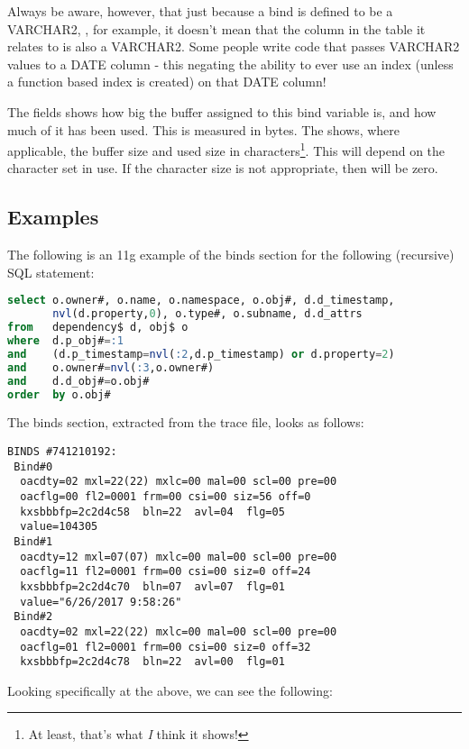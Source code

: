 Always be aware, however, that just because a bind is defined to be a VARCHAR2, , for example, it doesn't mean that the column in the table it relates to is also a VARCHAR2. Some people write code that passes VARCHAR2 values to a DATE column - this negating the ability to ever use an index (unless a function based index is created) on that DATE column!

The  fields shows how big the buffer assigned to this bind variable is, and how much of it has been used. This is measured in bytes. The  shows, where applicable, the buffer size and used size in characters\footnote{At least, that's what \emph{I} think it   shows!}. This will depend on the character set in use. If the character size is not appropriate, then  will be zero.

\subsection{Examples}\label{examples}

The following is an 11g example of the binds section for the following (recursive) SQL statement:

\begin{lstlisting}[language=SQL,caption={Example of Recursive SQL Statement}]
select o.owner#, o.name, o.namespace, o.obj#, d.d_timestamp, 
       nvl(d.property,0), o.type#, o.subname, d.d_attrs  
from   dependency$ d, obj$ o 
where  d.p_obj#=:1 
and    (d.p_timestamp=nvl(:2,d.p_timestamp) or d.property=2) 
and    o.owner#=nvl(:3,o.owner#) 
and    d.d_obj#=o.obj# 
order  by o.obj#
\end{lstlisting}

The binds section, extracted from the trace file, looks as follows:

\begin{lstlisting}[numbers=none,caption={Binds Lines}]
BINDS #741210192:
 Bind#0
  oacdty=02 mxl=22(22) mxlc=00 mal=00 scl=00 pre=00
  oacflg=00 fl2=0001 frm=00 csi=00 siz=56 off=0
  kxsbbbfp=2c2d4c58  bln=22  avl=04  flg=05
  value=104305
 Bind#1
  oacdty=12 mxl=07(07) mxlc=00 mal=00 scl=00 pre=00
  oacflg=11 fl2=0001 frm=00 csi=00 siz=0 off=24
  kxsbbbfp=2c2d4c70  bln=07  avl=07  flg=01
  value="6/26/2017 9:58:26"
 Bind#2
  oacdty=02 mxl=22(22) mxlc=00 mal=00 scl=00 pre=00
  oacflg=01 fl2=0001 frm=00 csi=00 siz=0 off=32
  kxsbbbfp=2c2d4c78  bln=22  avl=00  flg=01
\end{lstlisting}

Looking specifically at the above, we can see the following:

